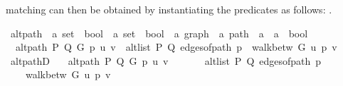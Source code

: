 \begin{isabellebody}
\begin{isamarkuptext}
matching  can then be obtained by instantiating the predicates as follows:
.%
\end{isamarkuptext}\isamarkuptrue%
\isamarkupfalse%
\ alt{\isacharunderscore}{\kern0pt}path\ {\isacharcolon}{\kern0pt}{\isacharcolon}{\kern0pt}\ {\isachardoublequoteopen}{\isacharparenleft}{\kern0pt}{\isacharprime}{\kern0pt}a\ set\ {\isasymRightarrow}\ bool{\isacharparenright}{\kern0pt}\ {\isasymRightarrow}\ {\isacharparenleft}{\kern0pt}{\isacharprime}{\kern0pt}a\ set\ {\isasymRightarrow}\ bool{\isacharparenright}{\kern0pt}\ {\isasymRightarrow}\ {\isacharprime}{\kern0pt}a\ graph\ {\isasymRightarrow}\ {\isacharprime}{\kern0pt}a\ path\ {\isasymRightarrow}\ {\isacharprime}{\kern0pt}a\ {\isasymRightarrow}\ {\isacharprime}{\kern0pt}a\ {\isasymRightarrow}\ bool{\isachardoublequoteclose}\ \isanewline
\ \ {\isachardoublequoteopen}alt{\isacharunderscore}{\kern0pt}path\ P\ Q\ G\ p\ u\ v\ {\isasymequiv}\ alt{\isacharunderscore}{\kern0pt}list\ P\ Q\ {\isacharparenleft}{\kern0pt}edges{\isacharunderscore}{\kern0pt}of{\isacharunderscore}{\kern0pt}path\ p{\isacharparenright}{\kern0pt}\ {\isasymand}\ walk{\isacharunderscore}{\kern0pt}betw\ G\ u\ p\ v{\isachardoublequoteclose}\isanewline
%
\isadeliminvisible
\isanewline
%
\endisadeliminvisible
%
\isataginvisible
{}\isamarkupfalse%
\ alt{\isacharunderscore}{\kern0pt}pathD{\isacharcolon}{\kern0pt}\isanewline
\ \ \ {\isachardoublequoteopen}alt{\isacharunderscore}{\kern0pt}path\ P\ Q\ G\ p\ u\ v{\isachardoublequoteclose}\isanewline
\ \ \isanewline
\ \ \ \ {\isachardoublequoteopen}alt{\isacharunderscore}{\kern0pt}list\ P\ Q\ {\isacharparenleft}{\kern0pt}edges{\isacharunderscore}{\kern0pt}of{\isacharunderscore}{\kern0pt}path\ p{\isacharparenright}{\kern0pt}{\isachardoublequoteclose}\isanewline
\ \ \ \ {\isachardoublequoteopen}walk{\isacharunderscore}{\kern0pt}betw\ G\ u\ p\ v{\isachardoublequoteclose}%
\endisataginvisible
{\isafoldinvisible}%
%
\isadeliminvisible
\isanewline
%
\endisadeliminvisible
%
\isadelimproof

\end{isabellebody}
